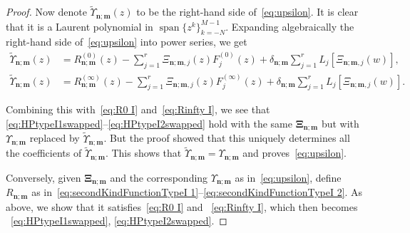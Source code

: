 \documentclass[reqno,centertags,11pt,draft]{amsart}
\begin{document}
\begin{proof}
    Now denote $\widetilde{\Upsilon}_{\bm{n};\bm{m}}(z)$ to be the right-hand side of~\eqref{eq:upsilon}. It is clear that it is a Laurent polynomial in $\operatorname{span}\big\{z^k\big\}_{k = -N}^{M-1}$. Expanding algebraically the right-hand side of~\eqref{eq:upsilon} into power series, we get  
    \begin{align}
        \widetilde{\Upsilon}_{\bm{n};\bm{m}}(z)
        & =
        R^{(0)}_{\bm{n};\bm{m}}(z) - \sum_{j=1}^r \Xi_{\bm{n};\bm{m},j}(z) F_j^{(0)}(z) +\delta_{\bm{n};\bm{m}} \sum_{j = 1}^r L_j[\Xi_{\bm{n};\bm{m},j}(w)],
        \\
        \widetilde{\Upsilon}_{\bm{n};\bm{m}}(z)
        & =
        R^{(\infty)}_{\bm{n};\bm{m}}(z) - \sum_{j=1}^r \Xi_{\bm{n};\bm{m},j}(z) F^{(\infty)}_j(z) +\delta_{\bm{n};\bm{m}} \sum_{j = 1}^r L_j[\Xi_{\bm{n};\bm{m},j}(w)].
    \end{align}
    
    Combining this with~\eqref{eq:R0 I} and~\eqref{eq:Rinfty I}, we see that
\eqref{eq:HPtypeI1swapped}--\eqref{eq:HPtypeI2swapped} hold with the same $\bm{\Xi}_{\bm{n};\bm{m}}$ but with $\Upsilon_{\bm{n};\bm{m}}$ replaced by $\widetilde\Upsilon_{\bm{n};\bm{m}}$.  
    But the proof showed that this uniquely determines all the coefficients of $\widetilde\Upsilon_{\bm{n};\bm{m}}$. This shows that $\widetilde\Upsilon_{\bm{n};\bm{m}} = \Upsilon_{\bm{n};\bm{m}}$ and proves~\eqref{eq:upsilon}.
    
    Conversely, given $\bm{\Xi}_{\bm{n};\bm{m}}$ and the corresponding $\Upsilon_{\bm{n};\bm{m}}$ as in~\eqref{eq:upsilon}, define $R_{\bm{n};\bm{m}}$ as in~\eqref{eq:secondKindFunctionTypeI 1}--\eqref{eq:secondKindFunctionTypeI 2}. As above, we show that it satisfies~\eqref{eq:R0 I} and ~\eqref{eq:Rinfty I}, which then becomes ~\eqref{eq:HPtypeI1swapped}, \eqref{eq:HPtypeI2swapped}.
\end{proof}
\end{document}
